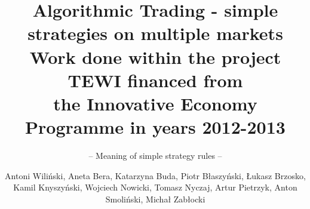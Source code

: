 \documentclass[envcountsame,envcountchap]{svmono}
\begin{document}
\author{Antoni Wiliński, Aneta Bera, Katarzyna Buda, Piotr Błaszyński, Łukasz Brzosko, Kamil Knyszyński, Wojciech Nowicki, Tomasz Nyczaj, Artur Pietrzyk, Anton Smoliński, Michał Zabłocki}
\title{Algorithmic Trading - simple strategies on multiple markets\\
{\small Work done within the project TEWI financed from \\
the Innovative Economy Programme in years 2012-2013}}
\subtitle{-- Meaning of simple strategy rules --}
\maketitle

\frontmatter%

%
%

\tableofcontents


\mainmatter%





%

\backmatter%
%

\printindex

\end{document}
